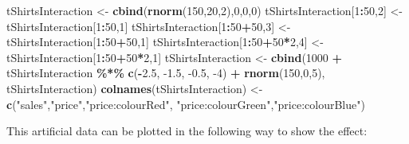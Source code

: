 \documentclass[
]{book}
\newenvironment{Shaded}{\begin{snugshade}}{\end{snugshade}}
\newcommand{\DecValTok}[1]{\textcolor[rgb]{0.00,0.00,0.81}{#1}}
\newcommand{\FloatTok}[1]{\textcolor[rgb]{0.00,0.00,0.81}{#1}}
\newcommand{\KeywordTok}[1]{\textcolor[rgb]{0.13,0.29,0.53}{\textbf{#1}}}
\newcommand{\NormalTok}[1]{#1}
\newcommand{\OperatorTok}[1]{\textcolor[rgb]{0.81,0.36,0.00}{\textbf{#1}}}
\newcommand{\StringTok}[1]{\textcolor[rgb]{0.31,0.60,0.02}{#1}}
\theoremstyle{definition}
\theoremstyle{definition}
\theoremstyle{definition}
\theoremstyle{definition}
\theoremstyle{remark}
\begin{document}
\begin{Shaded}
\begin{Highlighting}[]
\NormalTok{tShirtsInteraction \textless{}{-}}\StringTok{ }\KeywordTok{cbind}\NormalTok{(}\KeywordTok{rnorm}\NormalTok{(}\DecValTok{150}\NormalTok{,}\DecValTok{20}\NormalTok{,}\DecValTok{2}\NormalTok{),}\DecValTok{0}\NormalTok{,}\DecValTok{0}\NormalTok{,}\DecValTok{0}\NormalTok{)}
\NormalTok{tShirtsInteraction[}\DecValTok{1}\OperatorTok{:}\DecValTok{50}\NormalTok{,}\DecValTok{2}\NormalTok{] \textless{}{-}}\StringTok{ }\NormalTok{tShirtsInteraction[}\DecValTok{1}\OperatorTok{:}\DecValTok{50}\NormalTok{,}\DecValTok{1}\NormalTok{]}
\NormalTok{tShirtsInteraction[}\DecValTok{1}\OperatorTok{:}\DecValTok{50}\OperatorTok{+}\DecValTok{50}\NormalTok{,}\DecValTok{3}\NormalTok{] \textless{}{-}}\StringTok{ }\NormalTok{tShirtsInteraction[}\DecValTok{1}\OperatorTok{:}\DecValTok{50}\OperatorTok{+}\DecValTok{50}\NormalTok{,}\DecValTok{1}\NormalTok{]}
\NormalTok{tShirtsInteraction[}\DecValTok{1}\OperatorTok{:}\DecValTok{50}\OperatorTok{+}\DecValTok{50}\OperatorTok{*}\DecValTok{2}\NormalTok{,}\DecValTok{4}\NormalTok{] \textless{}{-}}\StringTok{ }\NormalTok{tShirtsInteraction[}\DecValTok{1}\OperatorTok{:}\DecValTok{50}\OperatorTok{+}\DecValTok{50}\OperatorTok{*}\DecValTok{2}\NormalTok{,}\DecValTok{1}\NormalTok{]}
\NormalTok{tShirtsInteraction \textless{}{-}}\StringTok{ }\KeywordTok{cbind}\NormalTok{(}\DecValTok{1000} \OperatorTok{+}\StringTok{ }\NormalTok{tShirtsInteraction }\OperatorTok{\%*\%}\StringTok{ }\KeywordTok{c}\NormalTok{(}\OperatorTok{{-}}\FloatTok{2.5}\NormalTok{, }\FloatTok{{-}1.5}\NormalTok{, }\FloatTok{{-}0.5}\NormalTok{, }\DecValTok{{-}4}\NormalTok{) }\OperatorTok{+}
\StringTok{                              }\KeywordTok{rnorm}\NormalTok{(}\DecValTok{150}\NormalTok{,}\DecValTok{0}\NormalTok{,}\DecValTok{5}\NormalTok{), tShirtsInteraction)}
\KeywordTok{colnames}\NormalTok{(tShirtsInteraction) \textless{}{-}}\StringTok{ }\KeywordTok{c}\NormalTok{(}\StringTok{"sales"}\NormalTok{,}\StringTok{"price"}\NormalTok{,}\StringTok{"price:colourRed"}\NormalTok{,}
                                  \StringTok{"price:colourGreen"}\NormalTok{,}\StringTok{"price:colourBlue"}\NormalTok{)}
\end{Highlighting}
\end{Shaded}

This artificial data can be plotted in the following way to show the effect:
\end{document}
